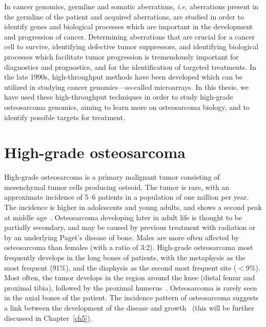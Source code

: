 In cancer genomics, germline and somatic aberrations, {\it i.e.} aberrations present in the germline of the patient and acquired aberrations, are studied in order to identify genes and biological processes which are important in the development and progression of cancer. Determining aberrations that are crucial for a cancer cell to survive, identifying defective tumor suppressors, and identifying biological processes which facilitate tumor progression is tremendously important for diagnostics and prognostics, and for the identification of targeted treatments. In the late 1990s, high\hyp{}throughput methods have been developed which can be utilized in studying cancer genomics---so-called microarrays. In this thesis, we have used these high\hyp{}throughput techniques in order to study high\hyp{}grade osteosarcoma genomics, aiming to learn more on osteosarcoma biology, and to identify possible targets for treatment.

%
\section{High-grade osteosarcoma}\label{high1}
High-grade osteosarcoma is a primary malignant tumor consisting of mesenchymal tumor cells producing osteoid. The tumor is rare, with an approximate incidence of 5--6 patients in a population of one million per year. The incidence is higher in adolescents and young adults, and shows a second peak at middle age~\cite{mirabello2009osteosarcoma}. Osteosarcoma developing later in adult life is thought to be partially secondary, and may be caused by previous treatment with radiation or by an underlying Paget's disease of bone. Males are more often affected by osteosarcoma than females (with a ratio of 3:2). High\hyp{}grade osteosarcoma most frequently develops in the long bones of patients, with the metaphysis as the most frequent (91\%), and the diaphysis as the second most frequent site ($<9\%$). Most often, the tumor develops in the region around the knee (distal femur and proximal tibia), followed by the proximal humerus~\cite{raymond2002conventional}. Osteosarcoma is rarely seen in the axial bones of the patient. The incidence pattern of osteosarcoma suggests a link between the development of the disease and growth~\cite{mirabello2011height} (this will be further discussed in Chapter~\ref{ch5}).

